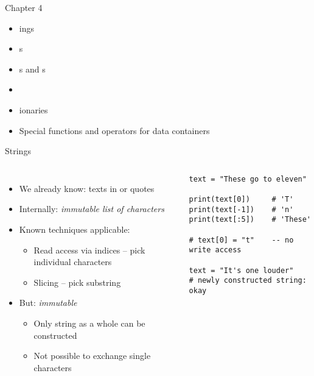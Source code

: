
\begin{frame}[fragile]{Chapter 4}
%
\begin{itemize}
\item {}ings
\item {}s
\item {}s and s
\item {}
\item {}ionaries
\item Special functions and operators for data containers
\end{itemize}
%
\end{frame}


\begin{frame}[fragile]{Strings}
%
\begin{columns}[T]
\begin{itemize}
\item We already know: texts in  or  quotes
\item Internally: \emph{immutable list of characters}
\item Known techniques applicable:
	\begin{itemize}
	\item Read access via indices -- pick individual characters
	\item Slicing -- pick substring
	\end{itemize}
\item But: \emph{immutable}
	\begin{itemize}
	\item Only string as a whole can be constructed
	\item Not possible to exchange single characters
	\end{itemize}
\end{itemize}
%
\begin{codebox}
\begin{verbatim}
text = "These go to eleven"

print(text[0])     # 'T'
print(text[-1])    # 'n'
print(text[:5])    # 'These'

# text[0] = "t"    -- no write access

text = "It's one louder" 
# newly constructed string: okay
\end{verbatim}
\end{codebox}
\end{columns}
%
\end{frame}

